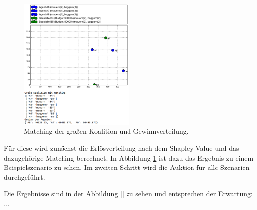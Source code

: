 \begin{figure}
  \centering
  \includegraphics[width=0.5\textwidth]{example-shapley-value.png}
  \caption{Matching der großen Koalition und Gewinnverteilung.}
  \label{example-shapley-value}
\end{figure}

Für diese wird zunächst die Erlösverteilung nach dem Shapley Value und das dazugehörige Matching berechnet. In Abbildung \ref{example-shapley-value} ist dazu das Ergebnis zu einem Beispielszenario zu sehen. Im zweiten Schritt wird die Auktion für alle Szenarien durchgeführt.


Die Ergebnisse sind in der Abbildung \ref{} zu sehen und entsprechen der Erwartung: ...

